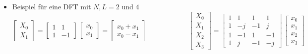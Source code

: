		\begin{itemize}
		 \item Beispiel für eine DFT mit $N,L = 2$ und $4$\\
		 $\begin{bmatrix}X_0\\X_1\end{bmatrix} = \begin{bmatrix}1 & 1\\ 1 & -1 \end{bmatrix}\,\begin{bmatrix}x_0\\x_1\end{bmatrix} = \begin{bmatrix}x_0+x_1\\x_0-x_1\end{bmatrix}\qquad\qquad\qquad
		 \begin{bmatrix}X_0\\X_1\\X_2\\X_3\end{bmatrix} = \begin{bmatrix}1 & 1 & 1 & 1\\ 1 & -j &  -1 & j \\ 1&-1&1&-1\\1 & j & -1 & -j\end{bmatrix}\,\begin{bmatrix}x_0\\x_1\\x_2\\x_3\end{bmatrix}$\\[-0.3cm]
		\end{itemize}

